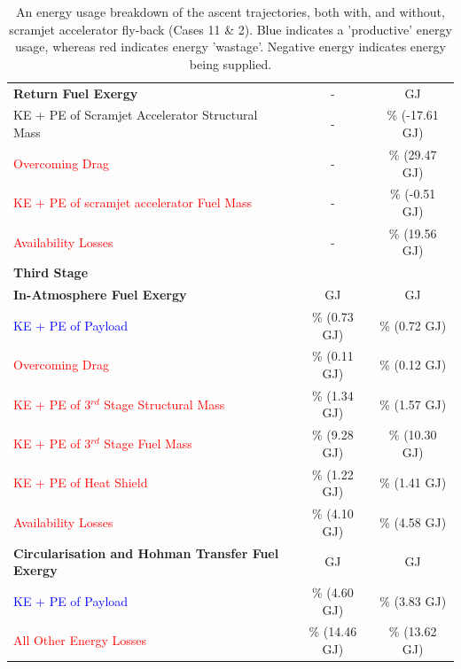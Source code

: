 \begin{table}[!ht]
\begin{tabular}{l c c}
		
		
		\textbf{Return Fuel Exergy} 
		& - & \textbf{\returnEnergyStandard} GJ
		\\
		KE + PE of Scramjet Accelerator Structural Mass
		& - & \WreturnStandard \% (-17.61 GJ)
		\\
		\textcolor{red}{Overcoming Drag}
		& - & \WDreturnStandard \% (29.47 GJ)
		\\
		\textcolor{red}{KE + PE of scramjet accelerator Fuel Mass}  
		& - & \WmFreturnStandard \% (-0.51 GJ)
		\\
		\textcolor{red}{Availability Losses}  
		& - & \PlossreturnCombinedStandard \% (19.56 GJ)
		\\
		\textbf{Third Stage}  
		&
		&
		\\
		
		\textbf{In-Atmosphere Fuel Exergy}  
		& \textbf{\thirdEnergyStandardNoReturn} GJ & \textbf{\thirdEnergyStandard} GJ
		\\
		\textcolor{blue}{KE + PE of Payload}  
		&\thirddExergyEffAtmStandardNoReturn \% (0.73 GJ) &\thirddExergyEffAtmStandard \% (0.72 GJ)
		\\
		\textcolor{red}{Overcoming Drag}  
		& \WDthreeStandardNoReturn \% (0.11 GJ) & \WDthreeStandard \% (0.12 GJ)
		\\
		\textcolor{red}{KE + PE  of 3$^{rd}$ Stage Structural Mass}  
		& \WthreeStandardNoReturn \% (1.34 GJ) & \WthreeStandard \% (1.57 GJ)
		\\
		
		\textcolor{red}{KE + PE  of 3$^{rd}$ Stage Fuel Mass}  
		& \WmFthreeStandardNoReturn \% (9.28 GJ) & \WmFthreeStandard \% (10.30 GJ)
		\\
		
		\textcolor{red}{KE + PE of Heat Shield}  
		
		& \WHSthreeStandardNoReturn \% (1.22 GJ) & \WHSthreeStandard \% (1.41 GJ)
		\\
		
		\textcolor{red}{Availability Losses}   
		& \PlossthreeStandardNoReturn \% (4.10 GJ) & \PlossthreeStandard \% (4.58 GJ)
		\\
		\textbf{Circularisation and Hohman Transfer Fuel Exergy}  
		& \textbf{\HTExergyStandardNoReturn}  GJ & \textbf{\HTExergyStandard}  GJ
		\\
		\textcolor{blue}{KE + PE of Payload}  
		& \HTeffStandardNoReturn \% (4.60 GJ) & \HTeffStandard \% (3.83 GJ)
		\\
		\textcolor{red}{All Other Energy Losses}  
		& \HTlossStandardNoReturn \% (14.46 GJ) & \HTlossStandard \% (13.62 GJ)
		\\
		\hline 
	
	\end{tabular} 
	\caption{An energy usage breakdown of the ascent trajectories, both with, and without, scramjet accelerator fly-back (Cases 11 \& 2). Blue indicates a 'productive' energy usage, whereas red indicates energy 'wastage'. Negative energy indicates energy being supplied.}
	\label{tab:effStandard}
\end{table}


